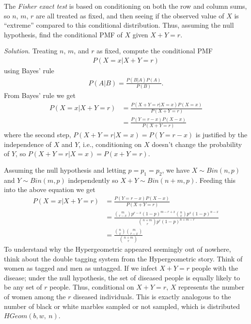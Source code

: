 \documentclass[11pt,a4paper]{article}
\begin{document}
The \emph{Fisher exact test} is based on conditioning on both the row
and column sums, so \(n\), \(m\), \(r\) are all treated as fixed, 
and then seeing if the observed value of \(X\) is ``extreme'' compared to
this conditional distribution.
Thus, 
assuming the null hypothesis, 
find the conditional PMF of \(X\) given \(X + Y = r\).

\emph{Solution}. 
Treating \(n\), \(m\), and \(r\) as fixed, 
compute the conditional PMF
\begin{align}
P\left( X = x | X + Y = r \right)
\end{align}
using Bayes' rule
\begin{align}
P\left( A | B \right) = \frac{P\left( B | A \right)P(A)}{P(B)}.
\end{align}
From Bayes' rule we get
\begin{align}
P\left( X = x | X + Y = r \right) &= \frac{P\left( X + Y = r | X = x \right)P(X = x)}{\ P(X + Y = r)} \\
&= \frac{P(Y = r - x)P(X - x)}{P(X + Y = r)}
\end{align}
where the second step,
\(P\left( X + Y = r | X = x \right) = P(Y = r - x)\) is justified by the independence of \(X\) and \(Y\), 
i.e., conditioning on \(X\) doesn't change the probability of \(Y\), 
so \(P\left( X + Y = r | X = x \right) = P(x + Y = r)\).

Assuming the null hypothesis and letting \(p = p_{1} = p_{2}\), 
we have \(X \sim Bin(n, p)\) and \(Y \sim Bin(m, p)\) independently so \(X + Y \sim Bin(n + m,p)\). 
Feeding this into the above equation we get
\begin{align}
P\left( X = x | X + Y = r \right) &= \frac{P(Y = r - x)P(X - x)}{\ P(X + Y = r)}\\
&= \frac{\binom{m}{r - x}p^{r - x}(1 - p)^{m - r + x}\binom{n}{x}p^{x}(1 - p)^{n - x}}{\binom{n + m}{r}p^{r}(1 - p)^{n + m - r}} \\
&= \frac{\binom{n}{x}\binom{m}{r - x}}{\binom{n + m}{r}}
\end{align}
To understand why the Hypergeometric appeared seemingly out of nowhere,
think about the double tagging system from the Hypergeometric story.
Think of women as tagged and men as untagged. 
If we infect \(X + Y = r\) people with the disease; 
under the null hypothesis, 
the set of diseased people is equally likely to be any set of \(r\) people. 
Thus,
conditional on \(X + Y = r\), 
\(X\) represents the number of women among the \(r\) diseased individuals. 
This is exactly analogous to the number of black or white marbles sampled or not sampled, 
which is distributed \(HGeom(b,w,\ n)\).%
\end{document}
